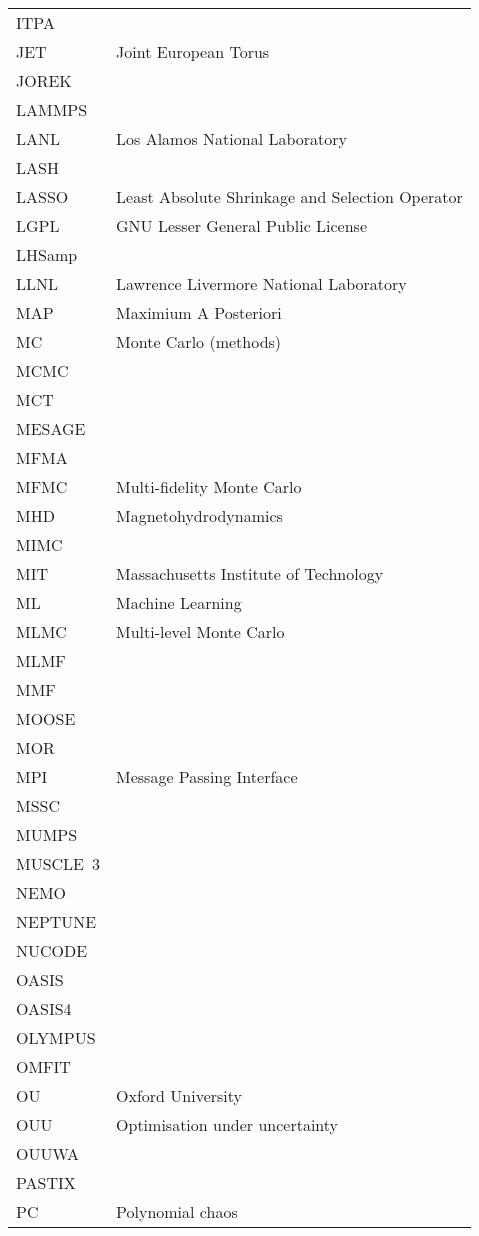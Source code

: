 \begin{longtable}{|p{4.0cm}|p{12.0cm}|}
ITPA & \\
JET & Joint European Torus \\
JOREK & \\
LAMMPS & \\
LANL & Los Alamos National Laboratory \\
LASH & \\
LASSO & Least Absolute Shrinkage and Selection Operator \\
LGPL & GNU Lesser General Public License \\
LHSamp & \\
LLNL & Lawrence Livermore National Laboratory \\
MAP & Maximium A Posteriori \\
MC & Monte Carlo (methods) \\
MCMC & \\
MCT & \\
MESAGE & \\
MFMA & \\
MFMC & Multi-fidelity Monte Carlo \\
MHD & Magnetohydrodynamics \\
MIMC & \\
MIT & Massachusetts Institute of Technology \\
ML & Machine Learning \\
MLMC & Multi-level Monte Carlo \\
MLMF & \\
MMF & \\
MOOSE & \\
MOR & \\
MPI & Message Passing Interface \\
MSSC & \\
MUMPS & \\
MUSCLE~3 & \\
NEMO & \\
NEPTUNE & \\
NUCODE & \\
OASIS & \\
OASIS4 & \\
OLYMPUS & \\
OMFIT & \\
OU & Oxford University \\
OUU & Optimisation under uncertainty \\
OUUWA & \\
PASTIX & \\
PC & Polynomial chaos \\

\end{longtable}
